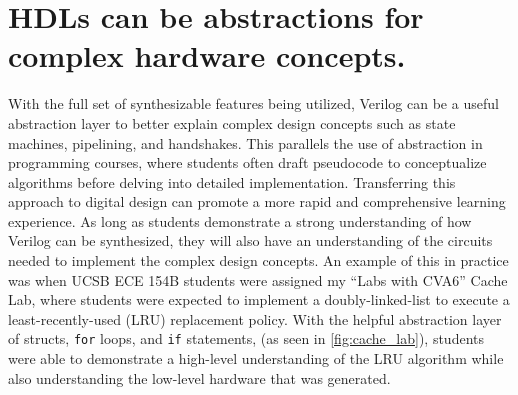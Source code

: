 \FloatBarrier

\section{HDLs can be abstractions for complex hardware concepts.}

With the full set of synthesizable features being utilized, Verilog can be a useful abstraction layer to better explain complex design concepts such as state machines, pipelining, and handshakes.
This parallels the use of abstraction in programming courses, where students often draft pseudocode to conceptualize algorithms before delving into detailed implementation.
Transferring this approach to digital design can promote a more rapid and comprehensive learning experience.
As long as students demonstrate a strong understanding of how Verilog can be synthesized, they will also have an understanding of the circuits needed to implement the complex design concepts.
An example of this in practice was when UCSB ECE 154B students were assigned my \enquote{Labs with CVA6} Cache Lab, where students were expected to implement a doubly-linked-list to execute a least-recently-used (LRU) replacement policy.
With the helpful abstraction layer of structs, \texttt{for} loops, and \texttt{if} statements, (as seen in \autoref{fig:cache_lab}), students were able to demonstrate a high-level understanding of the LRU algorithm while also understanding the low-level hardware that was generated.
